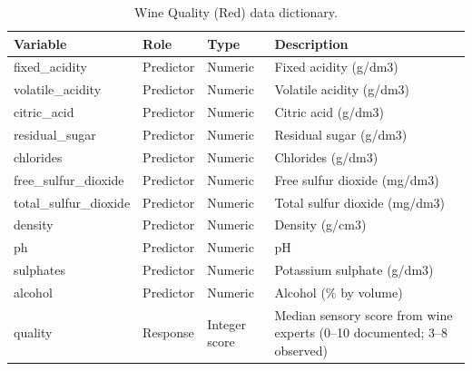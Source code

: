 \begin{table}

\caption{\label{tab:p1-data-dictionary}Wine Quality (Red) data dictionary.}
\centering
\begin{tabular}[t]{llll}
\toprule
Variable & Role & Type & Description\\
\midrule
fixed\_acidity & Predictor & Numeric & Fixed acidity (g/dm3)\\
volatile\_acidity & Predictor & Numeric & Volatile acidity (g/dm3)\\
citric\_acid & Predictor & Numeric & Citric acid (g/dm3)\\
residual\_sugar & Predictor & Numeric & Residual sugar (g/dm3)\\
chlorides & Predictor & Numeric & Chlorides (g/dm3)\\
\addlinespace
free\_sulfur\_dioxide & Predictor & Numeric & Free sulfur dioxide (mg/dm3)\\
total\_sulfur\_dioxide & Predictor & Numeric & Total sulfur dioxide (mg/dm3)\\
density & Predictor & Numeric & Density (g/cm3)\\
ph & Predictor & Numeric & pH\\
sulphates & Predictor & Numeric & Potassium sulphate (g/dm3)\\
\addlinespace
alcohol & Predictor & Numeric & Alcohol (\% by volume)\\
quality & Response & Integer score & Median sensory score from wine experts (0--10 documented; 3--8 observed)\\
\bottomrule
\end{tabular}
\end{table}
